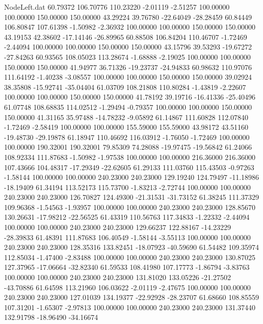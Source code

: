 \begin{filecontents}{NodeLeft.dat}
  60.79372  106.70776  110.23220    -2.01119   -2.51257  100.00000  100.00000  150.00000  150.00000   43.29224   39.76780  -22.64049  -28.28459
  60.84449  106.80847  107.61398    -1.50982   -2.36932  100.00000  100.00000  150.00000  150.00000   43.19153   42.38602  -17.14146  -26.89965
  60.88508  106.84204  110.46707    -1.72469   -2.44094  100.00000  100.00000  150.00000  150.00000   43.15796   39.53293  -19.67272  -27.84263
  60.93565  108.05023  113.28674    -1.68888   -2.19025  100.00000  100.00000  150.00000  150.00000   41.94977   36.71326  -19.23737  -24.94833
  60.98632  110.97076  111.64192    -1.40238   -3.08557  100.00000  100.00000  150.00000  150.00000   39.02924   38.35808  -15.92741  -35.04404
  61.03709  108.21808  110.80284    -1.43819   -2.22607  100.00000  100.00000  150.00000  150.00000   41.78192   39.19716  -16.41336  -25.40496
  61.07748  108.68835  114.02512    -1.29494   -0.79357  100.00000  100.00000  150.00000  150.00000   41.31165   35.97488  -14.78232   -9.05892
  61.14867  111.60828  112.07840    -1.72469   -2.58419  100.00000  100.00000  155.59000  155.59000   43.98172   43.51160  -19.48730  -29.19878
  61.18947  110.46692  116.03912    -1.76050   -1.72469  100.00000  100.00000  190.32001  190.32001   79.85309   74.28088  -19.97475  -19.56842
  61.24066  108.92334  111.87683    -1.50982   -1.97538  100.00000  100.00000  216.36000  216.36000  107.43666  104.48317  -17.29349  -22.62605
  61.29133  111.03760  115.43503    -0.97263   -1.58144  100.00000  100.00000  240.23000  240.23000  129.19240  124.79497  -11.18986  -18.19409
  61.34194  113.52173  115.73700    -1.83213   -2.72744  100.00000  100.00000  240.23000  240.23000  126.70827  124.49300  -21.31531  -31.73152
  61.38245  111.37329  109.96368    -1.54563   -1.93957  100.00000  100.00000  240.23000  240.23000  128.85670  130.26631  -17.98212  -22.56525
  61.43319  110.56763  117.34833    -1.22332   -2.44094  100.00000  100.00000  240.23000  240.23000  129.66237  122.88167  -14.23229  -28.39833
  61.48391  111.87683  106.40549    -1.58144   -3.55113  100.00000  100.00000  240.23000  240.23000  128.35316  133.82451  -18.07923  -40.59690
  61.54482  109.35974  112.85034    -1.47400   -2.83488  100.00000  100.00000  240.23000  240.23000  130.87025  127.37965  -17.06664  -32.82340
  61.59533  108.41980  107.17773    -1.86794   -3.83763  100.00000  100.00000  240.23000  240.23000  131.81020  133.05226  -21.27502  -43.70886
  61.64598  113.21960  106.03622    -2.01119   -2.47675  100.00000  100.00000  240.23000  240.23000  127.01039  134.19377  -22.92928  -28.23707
  61.68660  108.85559  107.31201    -1.65307   -2.97813  100.00000  100.00000  240.23000  240.23000  131.37440  132.91798  -18.96490  -34.16674

\end{filecontents}
